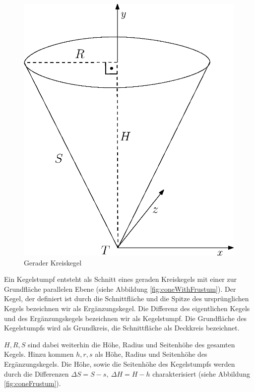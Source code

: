 \begin{figure}[!htb]
	\centering
	\includegraphics[scale=.5]{images/fullCone.eps}
	\caption{Gerader Kreiskegel}
	\label{fig:cone}
\end{figure}



\begin{definition}
	Ein Kegelstumpf entsteht als Schnitt eines geraden Kreiskegels mit einer zur Grundfläche parallelen Ebene (siehe Abbildung \ref{fig:coneWithFrustum}). Der Kegel, der definiert ist durch die Schnittfläche und die Spitze des ursprünglichen Kegels bezeichnen wir als Ergänzungskegel. Die Differenz des eigentlichen Kegels und des Ergänzungskegels bezeichnen wir als Kegelstumpf. Die Grundfläche des Kegelstumpfs wird als Grundkreis, die Schnittfläche als Deckkreis bezeichnet.

	\noindent $H, R, S$ sind dabei weiterhin die Höhe, Radius und Seitenhöhe des gesamten Kegels. Hinzu kommen $h,r,s$ als Höhe, Radius und Seitenhöhe des Ergänzungskegels. Die Höhe, sowie die Seitenhöhe des Kegelstumpfs werden durch die Differenzen $\Delta S = S - s,~ \Delta H = H-h$ charakterisiert (siehe Abbildung \ref{fig:coneFrustum}).
\end{definition}


